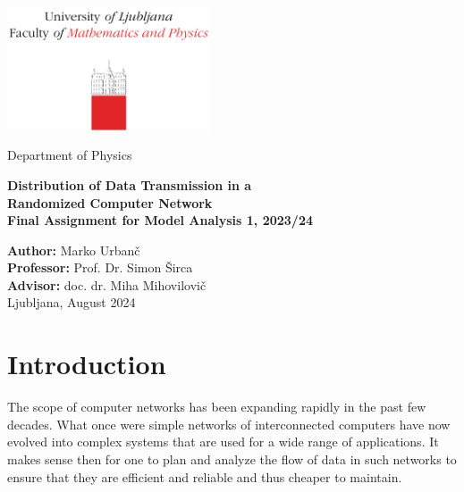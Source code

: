 \documentclass[10pt, titlepage, a4paper]{article}
\begin{document}
\begin{titlepage}
{\centering
\includegraphics[width=6cm]{logo_fmf.pdf}

\vspace{0.8cm}
{\small Department of Physics}

\vspace{5cm}
\vspace{0.5cm}
{\huge\textbf{Distribution of Data Transmission in a}} \\
\vspace{0.2cm}
{\huge\textbf{Randomized Computer Network}} \\
\vspace{0.5cm}
{\large\textbf{Final Assignment for Model Analysis 1, 2023/24}}

\vfill
\textbf{Author:} Marko Urbanč \\
\textbf{Professor:} Prof. Dr. Simon Širca \\ 
\textbf{Advisor:}  doc. dr. Miha Mihovilovič \\

\vspace{1cm}
Ljubljana, August 2024 \\
}
\vspace{3cm}
\end{titlepage}

\hypersetup{pageanchor=true}
\setcounter{page}{2}
\tableofcontents
\vspace{1cm}


\section{Introduction}
The scope of computer networks has been expanding rapidly in the past few decades. What once were simple 
networks of interconnected computers have now evolved into complex systems that are used for a wide range of
applications. It makes sense then for one to plan and analyze the flow of data in such networks to ensure that
they are efficient and reliable and thus cheaper to maintain. \\
\end{document}

